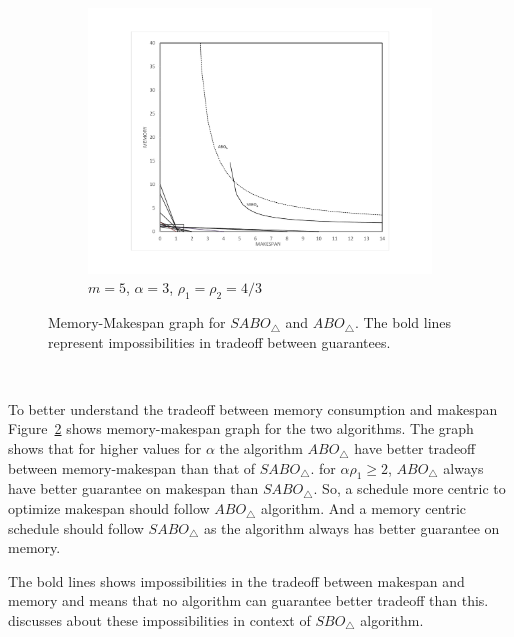 \begin {figure}
      \begin{subfigure}[b]{0.5\textwidth}
        \includegraphics[width=\textwidth]{graph_M10_ALPHsq_3_rho_133.pdf}
        \caption{$m=5$, $\alpha=3$, $\rho_1=\rho_2=4/3$}
        \label{fig:ch5-3.3}
      \end{subfigure} %
    
      \caption{Memory-Makespan graph for $SABO_\triangle$ and $ABO_\triangle$. The bold lines represent impossibilities in tradeoff between guarantees.}
      \label{fig:ch5-3}
    \end{figure}\
    
 To better understand the tradeoff between memory consumption and makespan Figure~\ref{fig:ch5-3} shows memory-makespan graph for the two algorithms. The graph shows that for higher values for $\alpha$ the  algorithm $ABO_\triangle$ have better tradeoff between memory-makespan than that of  $SABO_\triangle$. for $\alpha\rho_1\geq 2$,  $ABO_\triangle$ always have better guarantee on makespan than $SABO_\triangle$. So, a schedule more centric to optimize makespan should follow $ABO_\triangle$ algorithm. And a memory centric schedule should follow $SABO_\triangle$ as the algorithm always has better guarantee on memory.
 
 The bold lines shows impossibilities in the tradeoff between makespan and memory and means that no algorithm can guarantee better tradeoff than this. \cite{10.1109/IPDPS.2008.4536292} discusses about these impossibilities in context of $SBO_\triangle$ algorithm.
 
  
              
               
               
        